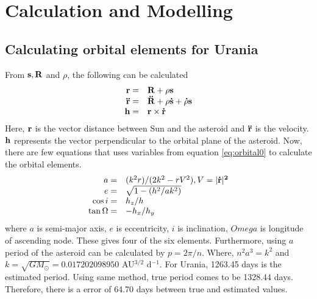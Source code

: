 \documentclass[a4paper,12pt]{article}
\begin{document}
\section{Calculation and Modelling}
\label{sec:calc}

\subsection{Calculating orbital elements for Urania}
\label{sec:elements}

From $\bf{s}, \bf{R}$ and $\rho$, the following can be calculated
\begin{equation}
\label{eq:orbital0}
\begin{array}{rl}
\bf{r} =& \bf{R}+ \rho \bf{s}\\
\bf{\ddot{r}} =& \bf{\ddot{R}+\rho \bf{\dot{s}}+\dot{\rho}\bf{s}}\\
\bf{h} =& \bf{r \times \dot{r}} \\

\end{array}
\end{equation}
Here, $\bf{r}$ is the vector distance between Sun and the asteroid and $\bf{\ddot{r}}$ is the velocity. $\bf{h}$ represents the vector perpendicular to the orbital plane of the asteroid. Now, there are few equations that uses variables from equation \ref{eq:orbital0} to calculate the orbital elements.
\begin{equation}
\label{eq:orbital1}
\begin{array}{rl}
a =& (k^2r)/(2k^2-rV^2) , V = |\bf{\dot{r}}|^2\\
e =& \sqrt{1-(h^2/ak^2)}\\
\cos i =& h_z/h \\
\tan \Omega =& -h_x/h_y
\end{array}
\end{equation}
where $a$ is semi-major axis, $e$ is eccentricity, $i$ is inclination, $Omega$ is longitude of ascending node. These gives four of the six elements. Furthermore, using $a$ period of the asteroid can be calculated by $p = 2\pi /n$. Where, $n^2 a^3 = k^2$ and $k = \sqrt{GM_{\odot}}  = 0.017 202 098 950$ AU$^{3/2}$ d$^{-1}$. For Urania, 1263.45 days is the estimated period. Using same method, true period comes to be 1328.44 days. Therefore, there is a error of 64.70 days between true and estimated values.
\end{document}
